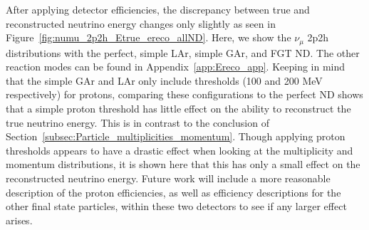 \documentclass[12pt]{article}
\begin{document}
After applying detector efficiencies, the discrepancy between true and reconstructed neutrino energy changes only slightly as seen in Figure~\ref{fig:numu_2p2h_Etrue_ereco_allND}. Here, we show the $\nu_\mu$ 2p2h distributions with the perfect, simple LAr, simple GAr, and FGT ND. The other reaction modes can be found in Appendix~\ref{app:Ereco_app}. Keeping in mind that the simple GAr and LAr only include thresholds (100 and 200 MeV respectively) for protons, comparing these configurations to the perfect ND shows that a simple proton threshold has little effect on the ability to reconstruct the true neutrino energy. This is in contrast to the conclusion of Section~\ref{subsec:Particle_multiplicities_momentum}. Though applying proton thresholds appears to have a drastic effect when looking at the multiplicity and momentum distributions, it is shown here that this has only a small effect on the reconstructed neutrino energy. Future work will include a more reasonable description of the proton efficiencies, as well as efficiency descriptions for the other final state particles, within these two detectors to see if any larger effect arises.
\end{document}
